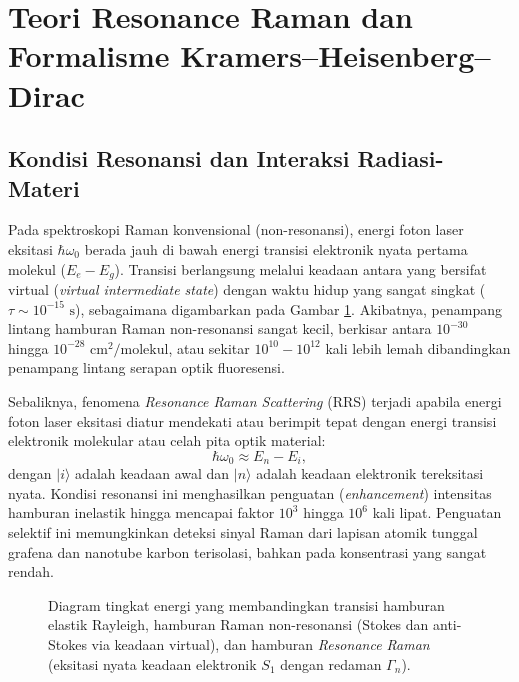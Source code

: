 \section{Teori Resonance Raman dan Formalisme Kramers--Heisenberg--Dirac}
\label{sec:resonance_raman}

\subsection{Kondisi Resonansi dan Interaksi Radiasi-Materi}
Pada spektroskopi Raman konvensional (non-resonansi), energi foton laser eksitasi $\hbar\omega_0$ berada jauh di bawah energi transisi elektronik nyata pertama molekul ($E_e - E_g$). Transisi berlangsung melalui keadaan antara yang bersifat virtual (\textit{virtual intermediate state}) dengan waktu hidup yang sangat singkat ($\tau \sim 10^{-15}\text{ s}$), sebagaimana digambarkan pada Gambar \ref{fig:energy_levels}. Akibatnya, penampang lintang hamburan Raman non-resonansi sangat kecil, berkisar antara $10^{-30}$ hingga $10^{-28}\text{ cm}^2/\text{molekul}$, atau sekitar $10^{10} - 10^{12}$ kali lebih lemah dibandingkan penampang lintang serapan optik fluoresensi.

Sebaliknya, fenomena \textit{Resonance Raman Scattering} (RRS) terjadi apabila energi foton laser eksitasi diatur mendekati atau berimpit tepat dengan energi transisi elektronik molekular atau celah pita optik material:
\begin{equation}
\hbar\omega_0 \approx E_n - E_i,
\label{eq:kondisi_resonansi}
\end{equation}
dengan $|i\rangle$ adalah keadaan awal dan $|n\rangle$ adalah keadaan elektronik tereksitasi nyata. Kondisi resonansi ini menghasilkan penguatan (\textit{enhancement}) intensitas hamburan inelastik hingga mencapai faktor $10^3$ hingga $10^6$ kali lipat. Penguatan selektif ini memungkinkan deteksi sinyal Raman dari lapisan atomik tunggal grafena dan nanotube karbon terisolasi, bahkan pada konsentrasi yang sangat rendah.

\begin{figure}[htbp]
\centering
\resizebox{0.82\textwidth}{!}{}
\caption{Diagram tingkat energi yang membandingkan transisi hamburan elastik Rayleigh, hamburan Raman non-resonansi (Stokes dan anti-Stokes via keadaan virtual), dan hamburan \textit{Resonance Raman} (eksitasi nyata keadaan elektronik $S_1$ dengan redaman $\Gamma_n$).}
\label{fig:energy_levels}
\end{figure}

